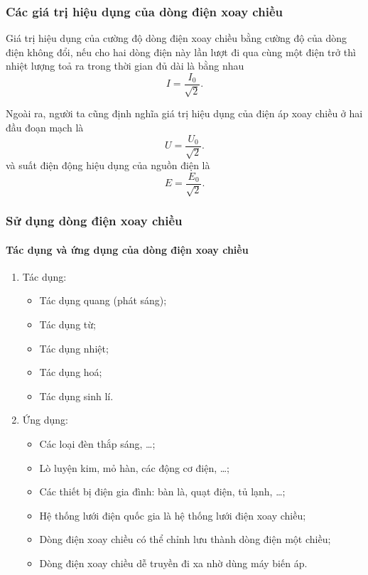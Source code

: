 \begin{tomtat}
\subsubsection{Các giá trị hiệu dụng của dòng điện xoay chiều}
\begin{dn}
	Giá trị hiệu dụng của cường độ dòng điện xoay chiều bằng cường độ của dòng điện không đổi, nếu cho hai dòng điện này lần lượt đi qua cùng một điện trở thì nhiệt lượng toả ra trong thời gian đủ dài là bằng nhau
	\begin{equation}
		I=\dfrac{I_0}{\sqrt{2}}.
	\end{equation}
\end{dn}
Ngoài ra, người ta cũng định nghĩa giá trị hiệu dụng của điện áp xoay chiều ở hai đầu đoạn mạch là
\begin{equation}
	U=\dfrac{U_0}{\sqrt{2}}.
\end{equation}
và suất điện động hiệu dụng của nguồn điện là
\begin{equation}
	E=\dfrac{E_0}{\sqrt{2}}.
\end{equation}
\subsubsection{Sử dụng dòng điện xoay chiều}
\paragraph{Tác dụng và ứng dụng của dòng điện xoay chiều}
\begin{enumerate}[label=\alph*.]
	\item Tác dụng:
	\begin{itemize}
		\item Tác dụng quang (phát sáng);
		\item Tác dụng từ;
		\item Tác dụng nhiệt;
		\item Tác dụng hoá;
		\item Tác dụng sinh lí.
	\end{itemize}
	\item Ứng dụng:
	\begin{itemize}
		\item Các loại đèn thắp sáng, \dots;
		\item Lò luyện kim, mỏ hàn, các động cơ điện, \dots;
		\item Các thiết bị điện gia đình: bàn là, quạt điện, tủ lạnh, \dots;
		\item Hệ thống lưới điện quốc gia là hệ thống lưới điện xoay chiều;
		\item Dòng điện xoay chiều có thể chỉnh lưu thành dòng điện một chiều;
		\item Dòng điện xoay chiều dễ truyền đi xa nhờ dùng máy biến áp.
	\end{itemize}
\end{enumerate}

\end{tomtat}
